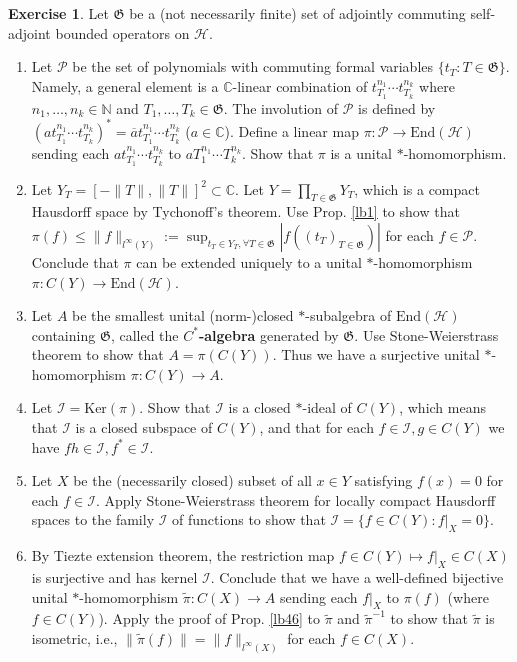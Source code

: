 \documentclass[12pt,b5paper,notitlepage]{article}
\theoremstyle{definition}
\newtheorem{exe}[df]{Exercise}
\theoremstyle{plain}
\newcommand{\fk}{\mathfrak}
\newcommand{\mc}{\mathcal}
\newcommand{\wtd}{\widetilde}
\newcommand{\ovl}{\overline}
\newcommand{\End}{\mathrm{End}} %
\newcommand{\Cbb}{\mathbb C}
\newcommand{\Nbb}{\mathbb N}
\newcommand{\Ker}{\mathrm{Ker}}
\numberwithin{equation}{section}
\begin{document}
\begin{exe}\label{lb64}
Let $\fk G$ be a (not necessarily finite) set of adjointly commuting self-adjoint bounded operators on $\mc H$. 
\begin{enumerate}
\item Let $\mc P$ be the set of polynomials with commuting  formal variables $\{t_T:T\in\fk G\}$. Namely, a general element is a $\Cbb$-linear combination of $t_{T_1}^{n_1}\cdots t_{T_k}^{n_k}$ where $n_1,\dots,n_k\in\Nbb$ and $T_1,\dots,T_k\in\fk G$. The involution of $\mc P$ is defined by $(at_{T_1}^{n_1}\cdots t_{T_k}^{n_k})^*=\ovl at_{T_1}^{n_1}\cdots t_{T_k}^{n_k}$ ($a\in\Cbb$). Define a linear map $\pi:\mc P\rightarrow\End(\mc H)$ sending each $at_{T_1}^{n_1}\cdots t_{T_k}^{n_k}$ to $aT_1^{n_1}\cdots T_k^{n_k}$. Show that $\pi$ is a unital $*$-homomorphism. 

\item Let $Y_T=[-\lVert T\lVert,\lVert T\lVert]^2\subset\Cbb$. Let $Y=\prod_{T\in\fk G}Y_T$, which is a compact Hausdorff space by Tychonoff's theorem. Use Prop. \ref{lb1} to show that $\pi(f)\leq \lVert f\lVert_{l^\infty(Y)}:=\sup_{t_T\in Y_T,\forall T\in\fk G}|f((t_T)_{T\in\fk G})|$ for each $f\in\mc P$. Conclude that $\pi$ can be extended uniquely to a unital $*$-homomorphism $\pi:C(Y)\rightarrow\End(\mc H)$. 

\item Let $A$ be the smallest unital (norm-)closed $*$-subalgebra of $\End(\mc H)$ containing $\fk G$, called the \textbf{$C^*$-algebra} generated by $\fk G$. Use Stone-Weierstrass theorem to show that $A=\pi(C(Y))$. Thus we have a surjective unital $*$-homomorphism $\pi:C(Y)\rightarrow A$.


\item Let $\mc I=\Ker(\pi)$. Show that $\mc I$ is a closed $*$-ideal of $C(Y)$, which means that $\mc I$ is a closed subspace of $C(Y)$, and that for each $f\in\mc I,g\in C(Y)$ we have $fh\in\mc I,f^*\in\mc I$.

\item Let $X$ be the (necessarily closed) subset of all $x\in Y$ satisfying $f(x)=0$ for each $f\in\mc I$. Apply Stone-Weierstrass theorem for locally compact Hausdorff spaces to the family $\mc I$ of functions to show that $\mc I=\{f\in C(Y):f|_X=0\}$. 

\item By Tiezte extension theorem, the restriction map $f\in C(Y)\mapsto f|_X\in C(X)$ is surjective and has kernel $\mc I$. Conclude that we have a well-defined bijective unital $*$-homomorphism $\wtd\pi:C(X)\rightarrow A$ sending each $f|_X$ to $\pi(f)$ (where $f\in C(Y)$). Apply the proof of Prop. \ref{lb46} to $\wtd\pi$ and $\wtd\pi^{-1}$ to show that $\wtd\pi$ is isometric, i.e., $\lVert  \wtd\pi(f)\lVert=\lVert f\lVert_{l^\infty(X)}$ for each $f\in C(X)$.


\end{enumerate}
\end{exe}
\end{document}
